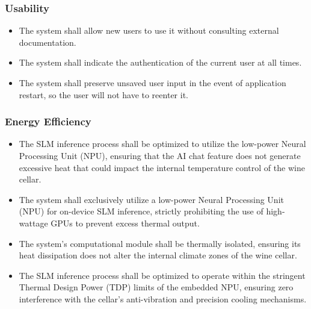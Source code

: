 \documentclass[conference]{IEEEtran}
\begin{document}
\subsubsection{Usability}
\begin{itemize}
    \item The system shall allow new users to use it without consulting external documentation.
    \item The system shall indicate the authentication of the current user at all times.
    \item The system shall preserve unsaved user input in the event of application restart, so the user will not have to reenter it.
\end{itemize}

\subsubsection{Energy Efficiency}
\begin{itemize}
    \item The SLM inference process shall be optimized to utilize the low-power Neural Processing Unit (NPU), ensuring that the AI chat feature does not generate excessive heat that could impact the internal temperature control of the wine cellar.
    \item The system shall exclusively utilize a low-power Neural Processing Unit (NPU) for on-device SLM inference, strictly prohibiting the use of high-wattage GPUs to prevent excess thermal output.
    \item The system's computational module shall be thermally isolated, ensuring its heat dissipation does not alter the internal climate zones of the wine cellar.
    \item The SLM inference process shall be optimized to operate within the stringent Thermal Design Power (TDP) limits of the embedded NPU, ensuring zero interference with the cellar's anti-vibration and precision cooling mechanisms.
\end{itemize}
\end{document}
